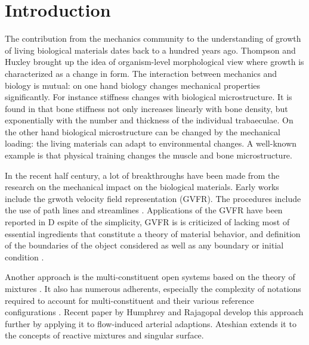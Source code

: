 \section{Introduction}
The contribution from the mechanics community to the understanding of growth of living biological materials dates back to a hundred years ago. Thompson \cite{Thompson} and Huxley \cite{Huxley} brought up the idea of organism-level morphological view where growth is characterized as a change in form. The interaction between mechanics and biology is mutual: on one hand biology changes mechanical properties significantly. For instance stiffness changes with biological microstructure. It is found in \cite{Carter} that bone stiffness not only increases linearly with bone density, but exponentially with the number and thickness of the individual trabaeculae. On the other hand biological microstructure can be changed by the mechanical loading: the living materials can adapt to environmental changes. A well-known example is that physical training changes the muscle and bone microstructure.

In the recent half century, a lot of breakthroughs have been made from the research on the mechanical impact on the biological materials. Early works include the grwoth velocity field representation (GVFR). The procedures include the use of path lines and streamlines \cite{Truesdell}. Applications of the GVFR have been reported in \cite{Erickson, Erickson2, Richards} D espite of the simplicity, GVFR is is criticized of lacking most of essential ingredients that constitute a theory of material behavior, and definition of the boundaries of the object considered as well as any boundary or initial condition \cite{Cowin}.

Another approach is the multi-constituent open systems based on the theory of mixtures \cite{Bowen, Rajagopal}. It also has numerous adherents, especially the complexity of notations required to account for multi-constituent and their various reference configurations \cite{Cowin}. Recent paper by Humphrey and Rajagopal \cite{Humphrey} develop this approach further by applying it to flow-induced arterial adaptions. Ateshian \cite{Ateshian} extends it to the concepts of reactive mixtures and singular surface.

